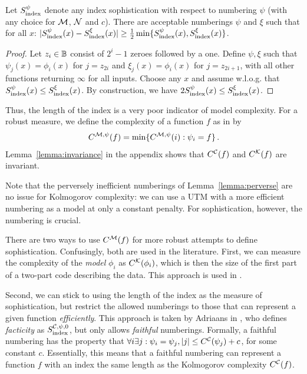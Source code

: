 \begin{lemma}\label{lemma:perverse}
Let $S_{\textnormal{index}}^\psi$ denote any index sophistication with respect to numbering $\psi$ (with any choice for ${\cal M}$, ${\cal N}$ and $c$). There are acceptable numberings $\psi$ and $\xi$ such that for all $x$: $|S_{\textnormal{index}}^\psi(x) - S_{\textnormal{index}}^\xi(x)|\geq \tfrac{1}{2}\min\{S_{\textnormal{index}}^\psi(x),S_{\textnormal{index}}^\xi(x)\}$.
\end{lemma}
\begin{proof}
Let $z_i \in {\mathbb B}$ consist of $2^{i}-1$ zeroes followed by a one. Define $\psi, \xi$ such that $\psi_j(x) = \phi_i(x)$ for $j = z_{2i}$ and $\xi_j(x) = \phi_i(x)$ for $j = z_{2i+1}$, with all other functions returning $\infty$ for all inputs. Choose any $x$ and assume w.l.o.g. that $S_\text{index}^\psi(x)\le S_\text{index}^\xi(x)$. By construction, we have $2S_\text{index}^\psi(x)  \leq S_\text{index}^\xi(x)$.
\end{proof}
Thus, the length of the index is a very poor indicator of model complexity. For a robust measure, we define the complexity of a function $f$ as in \cite{grunwald2004shannon,vitanyi2004meaningful} by 
\begin{align}
C^{{\cal M},\psi}(f) = \min\{C^{{\cal M},\psi}(i):\psi_i=f\} \,\text{.} \label{equation:function-complexity}
\end{align}
Lemma~\ref{lemma:invariance} in the appendix shows that $C^{\cal C}(f)$ and $C^{\cal K}(f)$ are invariant. 

Note that the perversely inefficient numberings of Lemma~\ref{lemma:perverse} are no issue for Kolmogorov complexity: we can use a UTM with a more efficient numbering as a model at only a constant penalty. For sophistication, however, the numbering is crucial.

There are two ways to use $C^{\cal M}(f)$ for more robust attempts to define sophistication. Confusingly, both are used in the literature. First, we can measure the complexity of the \emph{model} $\phi_i$ as $C^{\cal K}(\phi_i)$, which is then the size of the first part of a two-part code describing the data. This approach is used in  \cite{cover1985kolmogorov,gacs2001algorithmic,vitanyi2004meaningful,gellmann1996information}.

Second, we can stick to using the length of the index as the measure of sophistication, but restrict the allowed numberings to those that can represent a given function \emph{efficiently}. This approach is taken by Adriaans in \cite{adriaans2012facticity}, who defines \emph{facticity} as $S_\text{index}^{{\cal C},\psi,0}$, but only allows \emph{faithful} numberings. Formally, a faithful numbering has the property that $\forall i \exists j : \psi_i=\psi_j, |j|\le C^{{\cal C}}(\psi_j)+c$, for some constant $c$. Essentially, this means that a faithful numbering can represent a function $f$ with an index the same length as the Kolmogorov complexity $C^{\cal C}(f)$.

